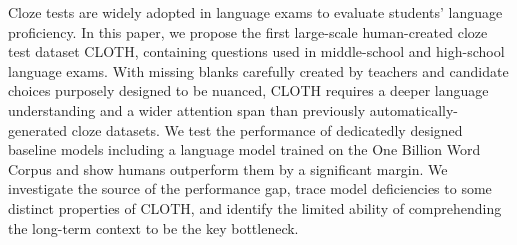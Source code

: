 Cloze tests are widely adopted in language exams to evaluate students' language proficiency. In this paper, we propose the first large-scale human-created cloze test dataset CLOTH, containing questions used in middle-school and high-school language exams. With missing blanks carefully created by teachers and candidate choices purposely designed to be nuanced, CLOTH requires a deeper language understanding and a wider attention span than previously automatically-generated cloze datasets. We test the performance of dedicatedly designed baseline models including a language model trained on the One Billion Word Corpus and show humans outperform them by a significant margin. We investigate the source of the performance gap, trace model deficiencies to some distinct properties of CLOTH, and identify the limited ability of comprehending the long-term context to be the key bottleneck.
